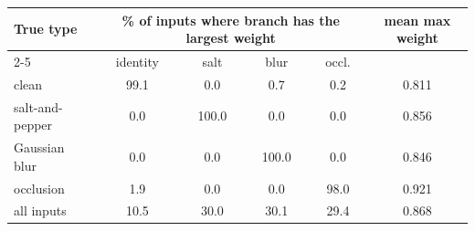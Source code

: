 \begin{tabular}{lccccc}
\toprule
True type & \multicolumn{4}{c}{\% of inputs where branch has the largest weight} & mean max weight \\
\cmidrule(lr){2-5}
 & identity & salt & blur & occl. & \\
\midrule
clean & 99.1 & 0.0 & 0.7 & 0.2 & 0.811 \\
salt-and-pepper & 0.0 & 100.0 & 0.0 & 0.0 & 0.856 \\
Gaussian blur & 0.0 & 0.0 & 100.0 & 0.0 & 0.846 \\
occlusion & 1.9 & 0.0 & 0.0 & 98.0 & 0.921 \\
\midrule
all inputs & 10.5 & 30.0 & 30.1 & 29.4 & 0.868 \\
\bottomrule
\end{tabular}
